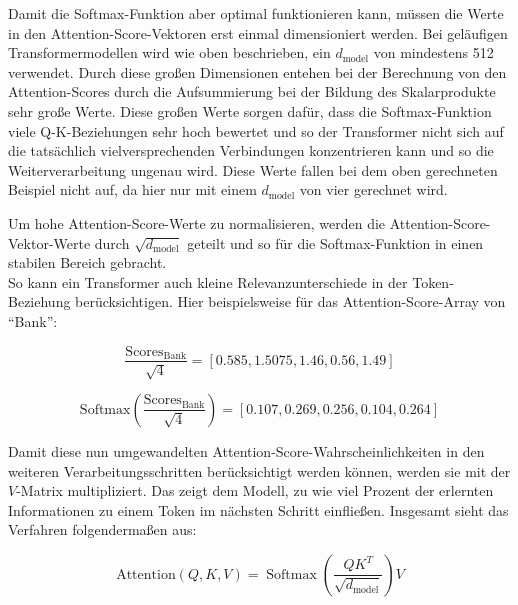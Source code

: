 Damit die Softmax-Funktion aber optimal funktionieren kann, müssen die Werte in den Attention-Score-Vektoren erst einmal dimensioniert werden.
Bei geläufigen Transformermodellen wird wie oben beschrieben, ein \( d_{\text{model}} \) von mindestens 512 verwendet.
Durch diese großen Dimensionen entehen bei der Berechnung von den Attention-Scores durch die Aufsummierung bei der Bildung des Skalarprodukte sehr große Werte.
Diese großen Werte sorgen dafür, dass die Softmax-Funktion viele Q-K-Beziehungen sehr hoch bewertet und so der Transformer nicht sich auf die tatsächlich vielversprechenden Verbindungen konzentrieren kann und so die Weiterverarbeitung ungenau wird.
Diese Werte fallen bei dem oben gerechneten Beispiel nicht auf, da hier nur mit einem \( d_{\text{model}} \) von vier gerechnet wird.

Um hohe Attention-Score-Werte zu normalisieren, werden die Attention-Score-Vektor-Werte durch \( \sqrt{d_{\text{model}}} \) geteilt und so für die Softmax-Funktion in einen stabilen Bereich gebracht. \\
So kann ein Transformer auch kleine Relevanzunterschiede in der Token-Beziehung berücksichtigen.
Hier beispielsweise für das Attention-Score-Array von \enquote{Bank}:

\[
\frac{\text{Scores}_{\text{Bank}}}{\sqrt{4}} = [0.585, 1.5075, 1.46, 0.56, 1.49]
\]

\[
\text{Softmax}\left(\frac{\text{Scores}_{\text{Bank}}}{\sqrt{4}}\right) = [0.107, 0.269, 0.256, 0.104, 0.264]
\]

Damit diese nun umgewandelten Attention-Score-Wahrscheinlichkeiten in den weiteren Verarbeitungsschritten berücksichtigt werden können, werden sie mit der \( V \)-Matrix multipliziert. 
Das zeigt dem Modell, zu wie viel Prozent der erlernten Informationen zu einem Token im nächsten Schritt einfließen.
Insgesamt sieht das Verfahren folgendermaßen aus:

\[
\text{Attention}(Q, K, V) = \operatorname{Softmax}\left(\frac{QK^T}{\sqrt{d_{\text{model}}}}\right) V
\]



